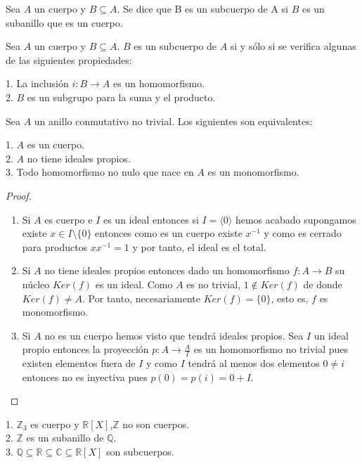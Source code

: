 \begin{definition}[Subcuerpo]
Sea $A$ un cuerpo y $B \subseteq A$. Se dice que B es un subcuerpo de A si $B$ es un subanillo que es un cuerpo. 
\end{definition}

\begin{proposition}
Sea $A$ un cuerpo y $B \subseteq A$. $B$ es un subcuerpo de $A$ si y sólo si se verifica algunas de las siguientes propiedades:

1. La inclusión $i:B \to A$ es un homomorfismo. \\
2. $B$ es un subgrupo para la suma y el producto. 
\end{proposition}

\begin{proposition}
Sea $A$ un anillo conmutativo no trivial. Los siguientes son equivalentes:

1. $A$ es un cuerpo. \\
2. $A$ no tiene ideales propios.\\ 
3. Todo homomorfismo no nulo que nace en $A$ es un monomorfismo. 
\end{proposition}
\begin{proof}
\begin{enumerate}
\item Si $A$ es cuerpo e $I$ es un ideal entonces si $I = \langle 0 \rangle$ hemos acabado supongamos existe $x \in I \setminus \{0\}$ entonces como es un cuerpo existe $x^{-1}$ y como es cerrado para productos $xx^{-1} = 1$ y por tanto, el ideal es el total. 

\item Si $A$ no tiene ideales propios entonces dado un homomorfismo $f:A \to B$ su núcleo $Ker(f)$ es un ideal. Como $A$ es no trivial, $1 \notin Ker(f)$ de donde $Ker(f) \neq A$. Por tanto, necesariamente $Ker(f) = \{0\}$, esto es, $f$ es monomorfismo. 

\item Si $A$ no es un cuerpo hemos visto que tendrá ideales propios. Sea $I$ un ideal propio entonces la proyección $p:A \to \frac{A}{I}$ es un homomorfismo no trivial pues existen elementos fuera de $I$ y como $I$ tendrá al menos dos elementos $0 \neq i$ entonces no es inyectiva pues $p(0) = p(i) = 0+I$. 
\end{enumerate}
\end{proof}

\begin{example}
1. $\mathbb{Z}_3$ es cuerpo y $\mathbb{R}[X]$,$\mathbb{Z}$ no son cuerpos.\\
2. $\mathbb{Z}$ es un subanillo de $\mathbb{Q}$.\\
3. $\mathbb{Q} \subseteq \mathbb{R} \subseteq \mathbb{C} \subseteq \mathbb{R}[X]$ son subcuerpos.\\
\end{example}

